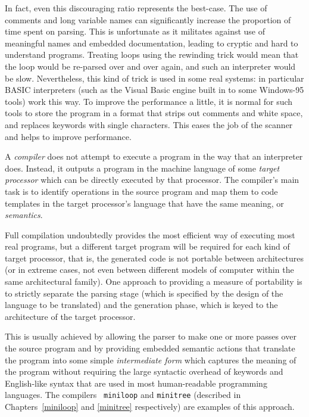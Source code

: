 In fact, even this discouraging ratio represents the best-case. The use
of comments and long variable names can significantly increase the
proportion of time spent on parsing. This is unfortunate as it militates
against use of meaningful names and embedded documentation, leading to
cryptic and hard to understand programs. Treating loops using the
rewinding trick would mean that the loop would be re-parsed over and
over again, and such an interpreter would be slow. Nevertheless, this
kind of trick is used in some real systems: in particular BASIC
interpreters (such as the Visual Basic engine built in to some Windows-95
tools) work this way. To improve the performance a little, it is normal
for such tools to store the program in a format that strips out
comments and white space, and replaces keywords with single characters. This
eases the job of the scanner and helps to improve performance.

A {\em compiler} does not attempt to execute a program in the way that
an interpreter does. Instead, it outputs a program in the machine
language of some {\em target processor} which can be directly executed
by that processor. The compiler's main task is to identify operations in
the source program and map them to code templates in the target
processor's language that have the same meaning, or {\em semantics}.

Full compilation undoubtedly provides the most efficient way of
executing most real programs, but a different target program will be
required for each kind of target processor, that is, the generated code
is not portable between architectures (or in extreme cases, not even
between different models of computer within the same architectural
family). One approach to providing a measure of portability is to
strictly separate the parsing stage (which is specified by the design of
the language to be translated) and the generation phase, which is keyed
to the architecture of the target processor. 

This is usually achieved by allowing the parser to make one or more
passes over the source program and by providing embedded semantic
actions that translate the program into some simple {\em intermediate
form} which captures the meaning of the program without requiring the
large syntactic overhead of keywords and English-like syntax that are
used in most human-readable programming languages. The compilers {\tt
miniloop} and {\tt minitree} (described in Chapters~\ref{miniloop} and
\ref{minitree} respectively) are examples of this approach.

